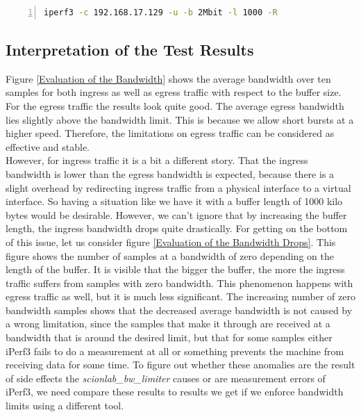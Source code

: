 \begin{lstlisting}[language=sh, caption = Example Ingress Test Command, captionpos=b, numbers=left, frame=single, breaklines=true, breakatwhitespace=true, showstringspaces=false, label=Example Ingress Test Command]
iperf3 -c 192.168.17.129 -u -b 2Mbit -l 1000 -R
\end{lstlisting}

\subsection{Interpretation of the Test Results}

Figure \ref{Evaluation of the Bandwidth} shows the average bandwidth over ten samples for both ingress as well as egress traffic with respect to the buffer size. For the egress traffic the results look quite good. The average egress bandwidth lies slightly above the bandwidth limit. This is because we allow short bursts at a higher speed. Therefore, the limitations on egress traffic can be considered as effective and stable.
\\
However, for ingress traffic it is a bit a different story. That the ingress bandwidth is lower than the egress bandwidth is expected, because there is a slight overhead by redirecting ingress traffic from a physical interface to a virtual interface. So having a situation like we have it with a buffer length of 1000 kilo bytes would be desirable. However, we can't ignore that by increasing the buffer length, the ingress bandwidth drops quite drastically. For getting on the bottom of this issue, let us consider figure \ref{Evaluation of the Bandwidth Drops}. This figure shows the number of samples at a bandwidth of zero depending on the length of the buffer. It is visible that the bigger the buffer, the more the ingress traffic suffers from samples with zero bandwidth. This phenomenon happens with egress traffic as well, but it is much less significant. The increasing number of zero bandwidth samples shows that the decreased average bandwidth is not caused by a wrong limitation, since the samples that make it through are received at a bandwidth that is around the desired limit, but that for some samples either iPerf3 fails to do a measurement at all or something prevents the machine from receiving data for some time. To figure out whether these anomalies are the result of side effects the \textit{scionlab\_bw\_limiter} causes or are measurement errors of iPerf3, we need compare these results to results we get if we enforce bandwidth limits using a different tool.

